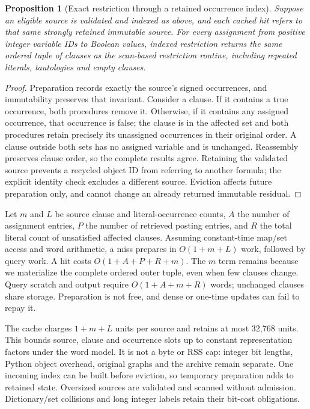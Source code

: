 \documentclass[11pt,a4paper]{article}
\numberwithin{equation}{section}
\theoremstyle{plain}
\newtheorem{proposition}[lemma]{Proposition}
\theoremstyle{definition}
\theoremstyle{remark}
\begin{document}
\begin{proposition}[Exact restriction through a retained occurrence index]
\label{prop:indexed-restriction}
Suppose an eligible source is validated and indexed as above, and each cached hit refers to that same strongly retained immutable source. For every assignment from positive integer variable IDs to Boolean values, indexed restriction returns the same ordered tuple of clauses as the scan-based restriction routine, including repeated literals, tautologies and empty clauses.
\end{proposition}
\begin{proof}
Preparation records exactly the source's signed occurrences, and immutability preserves that invariant. Consider a clause. If it contains a true occurrence, both procedures remove it. Otherwise, if it contains any assigned occurrence, that occurrence is false; the clause is in the affected set and both procedures retain precisely its unassigned occurrences in their original order. A clause outside both sets has no assigned variable and is unchanged. Reassembly preserves clause order, so the complete results agree. Retaining the validated source prevents a recycled object ID from referring to another formula; the explicit identity check excludes a different source. Eviction affects future preparation only, and cannot change an already returned immutable residual.
\end{proof}

Let $m$ and $L$ be source clause and literal-occurrence counts, $A$ the number of assignment entries, $P$ the number of retrieved posting entries, and $R$ the total literal count of unsatisfied affected clauses. Assuming constant-time map/set access and word arithmetic, a miss prepares in $O(1+m+L)$ work, followed by query work. A hit costs $O(1+A+P+R+m)$. The $m$ term remains because we materialize the complete ordered outer tuple, even when few clauses change. Query scratch and output require $O(1+A+m+R)$ words; unchanged clauses share storage. Preparation is not free, and dense or one-time updates can fail to repay it.

The cache charges $1+m+L$ units per source and retains at most 32,768 units. This bounds source, clause and occurrence slots up to constant representation factors under the word model. It is not a byte or RSS cap: integer bit lengths, Python object overhead, original graphs and the archive remain separate. One incoming index can be built before eviction, so temporary preparation adds to retained state. Oversized sources are validated and scanned without admission. Dictionary/set collisions and long integer labels retain their bit-cost obligations.
\end{document}
